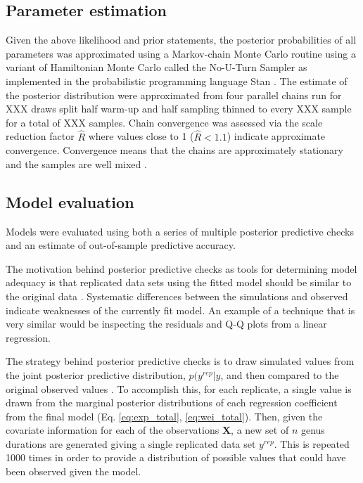 \documentclass[12pt,letterpaper]{article}
\begin{document}
\subsection{Parameter estimation}
Given the above likelihood and prior statements, the posterior probabilities of all parameters was approximated using a Markov-chain Monte Carlo routine using a variant of Hamiltonian Monte Carlo called the No-U-Turn Sampler \citep{Hoffman2014} as implemented in the probabilistic programming language Stan \citep{stan-software:2014}. The estimate of the posterior distribution were approximated from four parallel chains run for XXX draws split half warm-up and half sampling thinned to every XXX sample for a total of XXX samples. Chain convergence was assessed via the scale reduction factor \(\hat{R}\) where values close to 1 (\(\hat{R} < 1.1\)) indicate approximate convergence. Convergence means that the chains are approximately stationary and the samples are well mixed \citep{Gelman2013d}.


\subsection{Model evaluation}

Models were evaluated using both a series of multiple posterior predictive checks and an estimate of out-of-sample predictive accuracy. 

The motivation behind posterior predictive checks as tools for determining model adequacy is that replicated data sets using the fitted model should be similar to the original data \citep{Gelman2013d}. Systematic differences between the simulations and observed indicate weaknesses of the currently fit model. An example of a technique that is very similar would be inspecting the residuals and Q-Q plots from a linear regression.

The strategy behind posterior predictive checks is to draw simulated values from the joint posterior predictive distribution, \(p(y^{rep} | y\), and then compared to the original observed values \citep{Gelman2013d}. To accomplish this, for each replicate, a single value is drawn from the marginal posterior distributions of each regression coefficient from the final model (Eq. \ref{eq:exp_total}, \ref{eq:wei_total}). Then, given the covariate information for each of the observations \(\mathbf{X}\), a new set of \(n\) genus durations are generated giving a single replicated data set \(y^{rep}\). This is repeated 1000 times in order to provide a distribution of possible values that could have been observed given the model. 
\end{document}
